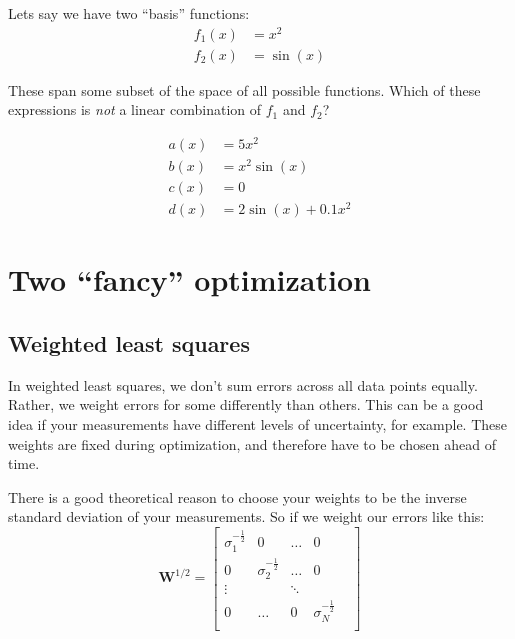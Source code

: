 \documentclass[11pt]{article}
\newcommand\wmtx{\boldsymbol{W}}
\begin{document}
Lets say we have two ``basis'' functions: 
\begin{equation}
    \begin{aligned}
        f_1(x) &= x^2 \\
        f_2(x) &= \sin(x)
    \end{aligned}
\end{equation}

These span some subset of the space of all possible functions.
Which of these expressions is \emph{not} a linear combination of $f_1$ and
$f_2$?

\begin{equation}
    \begin{aligned}
        a(x) &= 5x^2 \\
        b(x) &= x^2 \sin(x) \\
        c(x) &= 0 \\
        d(x) &= 2 \sin(x) + 0.1 x^2
    \end{aligned}
\end{equation}


\section{ Two ``fancy'' optimization }

\subsection{ Weighted least squares }

In weighted least squares, we don't sum errors across all data points
equally.  Rather, we weight errors for some differently than others.
This can be a good idea if your measurements have different levels of
uncertainty, for example.  These weights are fixed during optimization,
and therefore have to be chosen ahead of time.

There is a good theoretical reason to choose your weights to be the
inverse standard deviation of your measurements. 
So if we weight our errors like this:
\begin{equation}
    \wmtx^{1/2} =
    \begin{bmatrix}
        \sigma_1^{-\frac{1}{2}} & 0 & \ldots & 0 \\
        0 & \sigma_2^{-\frac{1}{2}} & \ldots & 0  \\
        \vdots & & \ddots & & \\
        0 & \ldots & 0 & \sigma_N^{-\frac{1}{2}} \\
    \end{bmatrix}
\end{equation}
\end{document}
